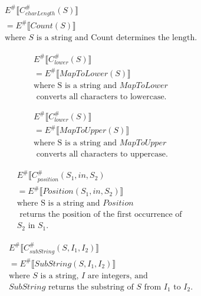 \begin{align*}
    E^\# \llbracket C_{charLength}^\# (S) \rrbracket \\
    = E^\# \llbracket Count(S) \rrbracket \\
    \text{where } S \text{ is a string and Count determines the length.}
\end{align*}

\begin{align*}
    E^\# \llbracket C_{lower}^\# (S) \rrbracket \\
    = E^\# \llbracket MapToLower (S) \rrbracket \\
    \text{where S is a string and } MapToLower \\
    \text{ converts all characters to lowercase.}
\end{align*}

\begin{align*}
    E^\# \llbracket C_{lower}^\# (S) \rrbracket \\
    = E^\# \llbracket MapToUpper (S) \rrbracket \\
    \text{where S is a string and } MapToUpper \\
    \text{ converts all characters to uppercase.}
\end{align*}

\begin{align*}
    E^\# \llbracket C_{position}^\# (S_1, in, S_2) \\
    = E^\# \llbracket Position(S_1, in, S_2) \rrbracket \\
    \text{where S is a string and } Position \\
    \text{ returns the position of the first occurrence of } \\
    S_2 \text{ in } S_1.
\end{align*}

\begin{align*}
    E^\# \llbracket C_{subString}^\# (S, I_1, I_2) \rrbracket \\
    = E^\# \llbracket SubString(S, I_1, I_2) \rrbracket \\
    \text{where } S \text{ is a string, } I \text{ are integers, and } \\
    SubString \text{ returns the substring of } S \text{ from } I_1 \text{ to } I_2.
\end{align*}

